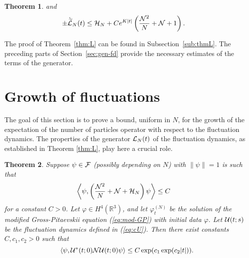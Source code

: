 \documentclass[11pt,a4paper]{article}
\newtheorem{thm}{Theorem}[section]  %
\newcommand{\ech}[2]{#2}	%
\newcommand{\ekt}{e^{K\lvert t\rvert}}	%
\newcommand{\cU}{{\cal U}}
\newcommand{\bR}{{\mathbb R}}
\newcommand{\wt}{\widetilde}
\newcommand{\cF}{{\cal F}}
\newcommand{\cH}{{\cal H}}
\newcommand{\cL}{{\cal L}}
\newcommand{\cN}{{\cal N}}
\newcommand{\Ncal}{\mathcal{N}}		%
\begin{document}
\begin{thm}
and 
\begin{equation}\label{eq:thmL-3}
\begin{split} 
\pm \dot{\wt{\cL}}_N (t)  \leq \; &\cH_N + \ech{C \| \varphi_t^{(N)} \|_{H^4}^2 \, \frac{\cN^2}{N}  \\ &+ C \left( \| \varphi_t^{(N)} \|_{H^4}  \| \varphi_t^{(N)} \|_{H^2} + \| \varphi_t^{(N)} \|_{H^2}^3 \right) \left(\cN+1 \right)}{C \ekt \left(\frac{\Ncal^2}{N} + \Ncal + 1 \right)}.  
\end{split}
\end{equation}
\end{thm}
The proof of Theorem~\ref{thm:L} can be found in Subsection~\ref{sub:thmL}. The preceding parts of Section~\ref{sec:gen-fd} provide the necessary estimates of the terms of the generator.

\section{Growth of fluctuations}
\label{s:growthoffluct}
The goal of this section is to prove a bound, uniform in $N$, for the growth of the expectation of the number of particles operator with respect to the fluctuation dynamics. The properties of the generator $\cL_N (t)$ of the fluctuation dynamics, as established in Theorem \ref{thm:L}, play here a crucial role.

\begin{thm}\label{thm:N}
Suppose $\psi \in \cF$ (possibly depending on $N$) with $\| \psi \|  =1$ is such that \begin{equation}\label{eq:ass-grw} \begin{split} \left\langle \psi , \left( \frac{\cN^2}{N} + \cN + \cH_N \right) \psi \right\rangle &\leq C  \end{split} \end{equation}
for a constant $C>0$. Let $\varphi \in H^4 (\bR^3)$, and let $\varphi_t^{(N)}$ be the solution of the modified Gross-Pitaevskii equation (\ref{eq:mod-GP}) with initial data $\varphi$. Let $\cU (t;s)$ be the fluctuation dynamics defined in (\ref{eq:cU}). Then there exist constants $C,c_1,c_2 > 0$ such that
\[ \langle \psi , \cU^* (t;0) \cN \cU (t;0) \psi \rangle \leq C \exp (c_1 \exp (c_2 |t|)). \] 
\end{thm}
\end{document}
